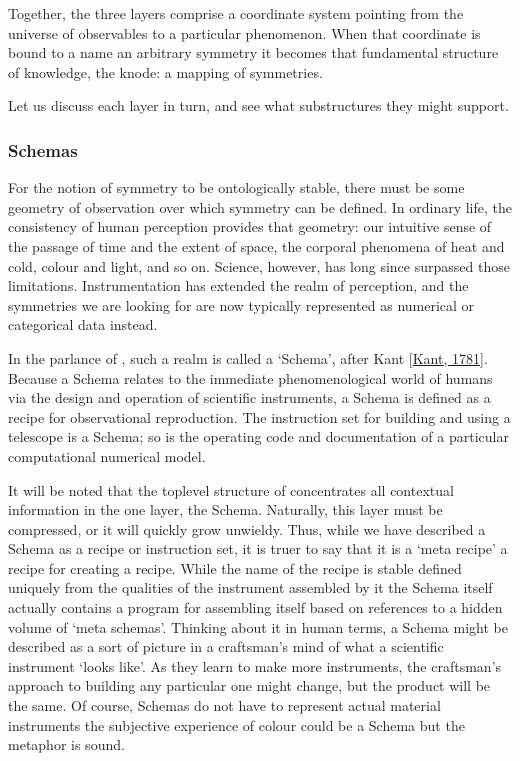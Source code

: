 \documentclass[letterpaper,10pt,english]{jupyterBook}
\begin{document}
\sphinxAtStartPar
Together, the three layers comprise a coordinate system pointing from the universe of observables to a particular phenomenon. When that coordinate is bound to a name \sphinxhyphen{} an arbitrary symmetry \sphinxhyphen{} it becomes that fundamental structure of knowledge, the knode: a mapping of symmetries.

\sphinxAtStartPar
Let us discuss each layer in turn, and see what substructures they might support.


\subsubsection{Schemas}
\label{\detokenize{content/chapter_03_everest/doctrine:schemas}}
\sphinxAtStartPar
For the notion of symmetry to be ontologically stable, there must be some geometry of observation over which symmetry can be defined. In ordinary life, the consistency of human perception provides that geometry: our intuitive sense of the passage of time and the extent of space, the corporal phenomena of heat and cold, colour and light, and so on. Science, however, has long since surpassed those limitations. Instrumentation has extended the realm of perception, and the symmetries we are looking for are now typically represented as numerical or categorical data instead.

\sphinxAtStartPar
In the parlance of , such a realm is called a ‘Schema’, after Kant {[}\hyperlink{cite.references:id683}{Kant, 1781}{]}. Because a Schema relates to the immediate phenomenological world of humans via the design and operation of scientific instruments, a Schema is defined as a recipe for observational reproduction. The instruction set for building and using a telescope is a Schema; so is the operating code and documentation of a particular computational numerical model.

\sphinxAtStartPar
It will be noted that the top\sphinxhyphen{}level structure of  concentrates all contextual information in the one layer, the Schema. Naturally, this layer must be compressed, or it will quickly grow unwieldy. Thus, while we have described a Schema as a recipe or instruction set, it is truer to say that it is a ‘meta recipe’ \sphinxhyphen{} a recipe for creating a recipe. While the name of the recipe is stable \sphinxhyphen{} defined uniquely from the qualities of the instrument assembled by it \sphinxhyphen{} the Schema itself actually contains a program for assembling itself based on references to a hidden volume of ‘meta schemas’. Thinking about it in human terms, a Schema might be described as a sort of picture in a craftsman’s mind of what a scientific instrument ‘looks like’. As they learn to make more instruments, the craftsman’s approach to building any particular one might change, but the product will be the same. Of course, Schemas do not have to represent actual material instruments \sphinxhyphen{} the subjective experience of colour could be a Schema \sphinxhyphen{} but the metaphor is sound.
\end{document}
